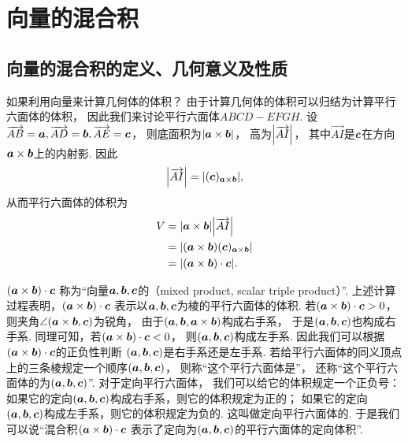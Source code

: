\section{向量的混合积}
\subsection{向量的混合积的定义、几何意义及性质}
如果利用向量来计算几何体的体积？
由于计算几何体的体积可以归结为计算平行六面体的体积，
因此我们来讨论平行六面体\(ABCD-EFGH\).
设\(\overrightarrow{AB}=\boldsymbol{a},
\overrightarrow{AD}=\boldsymbol{b},
\overrightarrow{AE}=\boldsymbol{c}\)，
则底面积为\(\abs{\boldsymbol{a}\times\boldsymbol{b}}\)，
高为\(\abs{\overrightarrow{AI}}\)，
其中\(\vec{AI}\)是\(\boldsymbol{c}\)在方向\(\boldsymbol{a}\times\boldsymbol{b}\)上的内射影.
因此\begin{equation*}
	\abs{\overrightarrow{AI}}
	= \abs{(\boldsymbol{c})_{\boldsymbol{a}\times\boldsymbol{b}}},
\end{equation*}
从而平行六面体的体积为
\begin{align*}
	V &= \abs{\boldsymbol{a}\times\boldsymbol{b}} \abs{\overrightarrow{AI}} \\
	&= \abs{(\boldsymbol{a}\times\boldsymbol{b}) (\boldsymbol{c})_{\boldsymbol{a}\times\boldsymbol{b}}} \\
	&= \abs{
			(\boldsymbol{a}\times\boldsymbol{b})\cdot\boldsymbol{c}
		}.
\end{align*}

\((\boldsymbol{a}\times\boldsymbol{b})\cdot\boldsymbol{c}\)
称为“向量\(\boldsymbol{a},\boldsymbol{b},\boldsymbol{c}\)的（mixed product, scalar triple product）”.
上述计算过程表明，\((\boldsymbol{a}\times\boldsymbol{b})\cdot\boldsymbol{c}\)
表示以\(\boldsymbol{a},\boldsymbol{b},\boldsymbol{c}\)为棱的平行六面体的体积.
若\((\boldsymbol{a}\times\boldsymbol{b})\cdot\boldsymbol{c}>0\)，
则夹角\(\angle(\boldsymbol{a}\times\boldsymbol{b},\boldsymbol{c})\)为锐角，
由于\((\boldsymbol{a},\boldsymbol{b},\boldsymbol{a}\times\boldsymbol{b})\)构成右手系，
于是\((\boldsymbol{a},\boldsymbol{b},\boldsymbol{c})\)也构成右手系.
同理可知，若\((\boldsymbol{a}\times\boldsymbol{b})\cdot\boldsymbol{c}<0\)，
则\((\boldsymbol{a},\boldsymbol{b},\boldsymbol{c})\)构成左手系.
因此我们可以根据\((\boldsymbol{a}\times\boldsymbol{b})\cdot\boldsymbol{c}\)的正负性判断
\((\boldsymbol{a},\boldsymbol{b},\boldsymbol{c})\)是右手系还是左手系.
若给平行六面体的同义顶点上的三条棱规定一个顺序\((\boldsymbol{a},\boldsymbol{b},\boldsymbol{c})\)，
则称“这个平行六面体是”，
还称“这个平行六面体的为\((\boldsymbol{a},\boldsymbol{b},\boldsymbol{c})\)”.
对于定向平行六面体，
我们可以给它的体积规定一个正负号：
如果它的定向\((\boldsymbol{a},\boldsymbol{b},\boldsymbol{c})\)构成右手系，则它的体积规定为正的；
如果它的定向\((\boldsymbol{a},\boldsymbol{b},\boldsymbol{c})\)构成左手系，则它的体积规定为负的.
这叫做定向平行六面体的.
于是我们可以说“混合积\((\boldsymbol{a}\times\boldsymbol{b})\cdot\boldsymbol{c}\)
表示了定向为\((\boldsymbol{a},\boldsymbol{b},\boldsymbol{c})\)的平行六面体的定向体积”.

